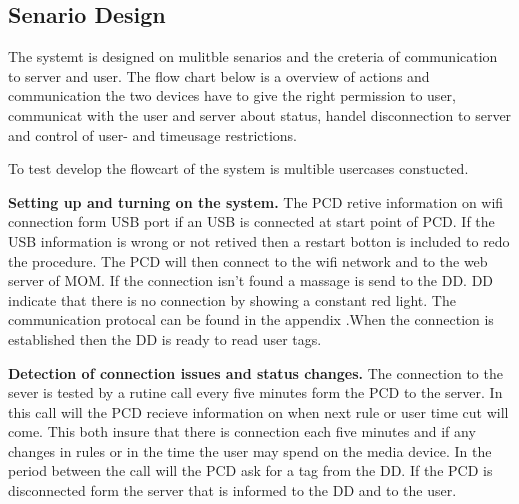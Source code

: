 \subsection{Senario Design}

The systemt is designed on mulitble senarios and the creteria of communication to server and user. The flow chart below is a overview of actions and communication the two devices have to give the right permission to user, communicat with the user and server about status, handel disconnection to server and control of user- and timeusage restrictions.\newline


To test develop the flowcart of the system is multible usercases constucted.\newline


\textbf{Setting up and turning on the system.} \newline
The PCD retive information on wifi connection form USB port if an USB is connected at start point of PCD. 
If the USB information is wrong or not retived then a restart botton is included to redo the procedure.  \newline
The PCD will then connect to the wifi network and to the web server of MOM. If the connection isn't found a massage is send to the DD. \newline DD indicate that there is no connection by showing a constant red light. The communication protocal can be found in the appendix  .\newline When the connection is established then the DD is ready to read user tags.\newline

\textbf{Detection of connection issues and status changes.} \newline
The connection to the sever is tested by a rutine call every five minutes form the PCD to the server. In this call will the PCD recieve information on when next rule or user time cut will come. This both insure that there is connection each five minutes and if any changes in rules or in the time the user may spend on the media device. In the period between the call will the PCD ask for a tag from the DD. If the PCD is disconnected form the server that is informed to the DD and to the user.  \newline
	
